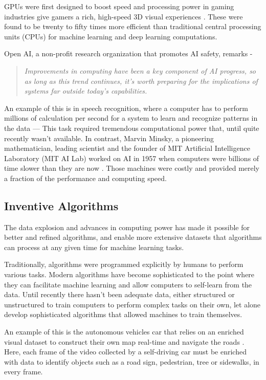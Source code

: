 GPUs were first designed to boost speed and processing power in gaming industries give gamers a rich, high-speed 3D visual experiences \cite{Yosinski2015}. These were found to be twenty to fifty times more efficient than traditional central processing units (CPUs) for machine learning and deep learning computations.

Open AI, a non-profit research organization that promotes AI safety, remarks\cite{aicompute} - \begin{quote}
    \textit{Improvements in computing have been a key component of AI progress, so as long as this trend continues, it’s worth preparing for the implications of systems far outside today’s capabilities.}
\end{quote}

An example of this is in speech recognition, where a computer has to perform millions of calculation per second for a system to learn and recognize patterns in the data — This task required tremendous computational power that, until quite recently wasn't available. In contrast, Marvin Minsky, a pioneering mathematician, leading scientist and the founder of MIT Artificial Intelligence Laboratory (MIT AI Lab) worked on AI in 1957 when computers were billions of time slower than they are now \cite{ubiquitous_ai}. Those machines were costly and provided merely a fraction of the performance and computing speed.

\subsection{Inventive Algorithms}
The data explosion and advances in computing power has made it possible for better and refined algorithms, and enable more extensive datasets that algorithms can process at any given time for machine learning tasks. 

Traditionally, algorithms were programmed explicitly by humans to perform various tasks. Modern algorithms have become sophisticated to the point where they can facilitate machine learning and allow computers to self-learn from the data. Until recently there hasn't been adequate data, either structured or unstructured to train computers to perform complex tasks on their own, let alone develop sophisticated algorithms that allowed machines to train themselves. 

An example of this is the autonomous vehicles car that relies on an enriched visual dataset to construct their own map real-time and navigate the roads \cite{shannon_mattern} \cite{tesla_autopilot}. Here, each frame of the video collected by a self-driving car must be enriched with data to identify objects such as a road sign, pedestrian, tree or sidewalks, in every frame.

